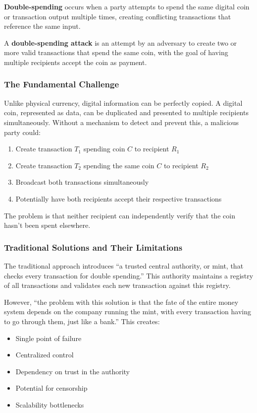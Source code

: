 \textbf{Double-spending} occurs when a party attempts to spend the same digital coin or transaction output multiple times, creating conflicting transactions that reference the same input.

A \textbf{double-spending attack} is an attempt by an adversary to create two or more valid transactions that spend the same coin, with the goal of having multiple recipients accept the coin as payment.

\subsubsection{The Fundamental Challenge}

Unlike physical currency, digital information can be perfectly copied. A digital coin, represented as data, can be duplicated and presented to multiple recipients simultaneously. Without a mechanism to detect and prevent this, a malicious party could:

\begin{enumerate}
  \item Create transaction $T_1$ spending coin $C$ to recipient $R_1$
  \item Create transaction $T_2$ spending the same coin $C$ to recipient $R_2$
  \item Broadcast both transactions simultaneously
  \item Potentially have both recipients accept their respective transactions
\end{enumerate}

The problem is that neither recipient can independently verify that the coin hasn't been spent elsewhere.

\subsubsection{Traditional Solutions and Their Limitations}

The traditional approach introduces ``a trusted central authority, or mint, that checks every transaction for double spending.'' This authority maintains a registry of all transactions and validates each new transaction against this registry.

However, ``the problem with this solution is that the fate of the entire money system depends on the company running the mint, with every transaction having to go through them, just like a bank.'' This creates:
\begin{itemize}
  \item Single point of failure
  \item Centralized control
  \item Dependency on trust in the authority
  \item Potential for censorship
  \item Scalability bottlenecks
\end{itemize}

